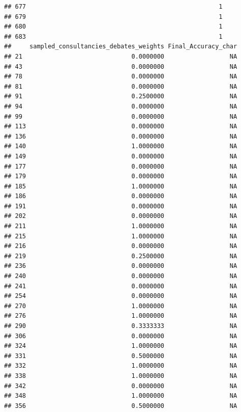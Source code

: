 \documentclass[
]{article}
\begin{document}
\begin{verbatim}
## 677                                                     1
## 679                                                     1
## 680                                                     1
## 683                                                     1
##     sampled_consultancies_debates_weights Final_Accuracy_char
## 21                              0.0000000                  NA
## 43                              0.0000000                  NA
## 78                              0.0000000                  NA
## 81                              0.0000000                  NA
## 91                              0.2500000                  NA
## 94                              0.0000000                  NA
## 99                              0.0000000                  NA
## 113                             0.0000000                  NA
## 136                             0.0000000                  NA
## 140                             1.0000000                  NA
## 149                             0.0000000                  NA
## 177                             0.0000000                  NA
## 179                             0.0000000                  NA
## 185                             1.0000000                  NA
## 186                             0.0000000                  NA
## 191                             0.0000000                  NA
## 202                             0.0000000                  NA
## 211                             1.0000000                  NA
## 215                             1.0000000                  NA
## 216                             0.0000000                  NA
## 219                             0.2500000                  NA
## 236                             0.0000000                  NA
## 240                             0.0000000                  NA
## 241                             0.0000000                  NA
## 254                             0.0000000                  NA
## 270                             1.0000000                  NA
## 276                             1.0000000                  NA
## 290                             0.3333333                  NA
## 306                             0.0000000                  NA
## 324                             1.0000000                  NA
## 331                             0.5000000                  NA
## 332                             1.0000000                  NA
## 338                             1.0000000                  NA
## 342                             0.0000000                  NA
## 348                             1.0000000                  NA
## 356                             0.5000000                  NA

\end{verbatim}
\end{document}

